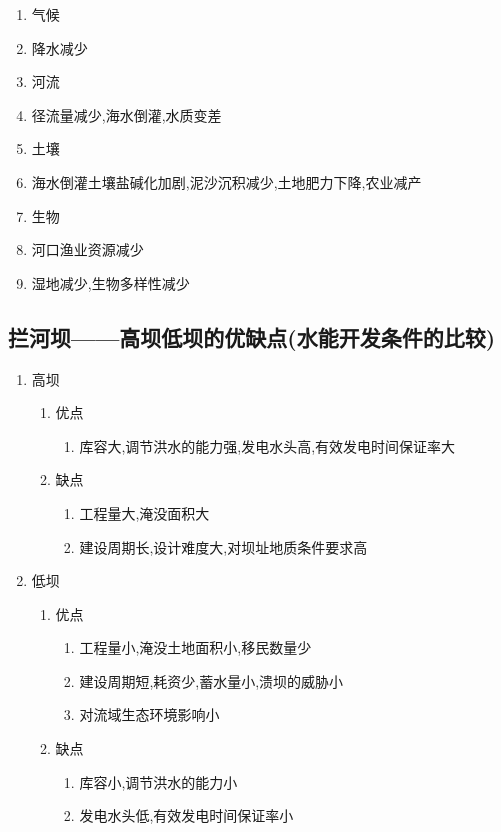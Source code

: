 \documentclass[a4paper]{article}
\begin{document}
\begin{enumerate}
\begin{enumerate}
\begin{enumerate}
                \item 气候
                    \item 降水减少
                \item 河流
                    \item 径流量减少,海水倒灌,水质变差
                \item 土壤
                    \item 海水倒灌土壤盐碱化加剧,泥沙沉积减少,土地肥力下降,农业减产
                \item 生物
                    \item 河口渔业资源减少
                    \item 湿地减少,生物多样性减少
            \end{enumerate}
        \end{enumerate}
    \end{enumerate}
    \subsection{拦河坝——高坝低坝的优缺点(水能开发条件的比较)}
    \begin{enumerate}
        \item 高坝
        \begin{enumerate}
            \item 优点
            \begin{enumerate}
                \item 库容大,调节洪水的能力强,发电水头高,有效发电时间保证率大
            \end{enumerate}
            \item 缺点
            \begin{enumerate}
                \item 工程量大,淹没面积大
                \item 建设周期长,设计难度大,对坝址地质条件要求高
            \end{enumerate}
        \end{enumerate}
        \item 低坝
        \begin{enumerate}
            \item 优点
            \begin{enumerate}
                \item 工程量小,淹没土地面积小,移民数量少
                \item 建设周期短,耗资少,蓄水量小,溃坝的威胁小
                \item 对流域生态环境影响小
            \end{enumerate}
            \item 缺点
            \begin{enumerate}
                \item 库容小,调节洪水的能力小
                \item 发电水头低,有效发电时间保证率小
            \end{enumerate}
        \end{enumerate}
    \end{enumerate}
\end{document}
